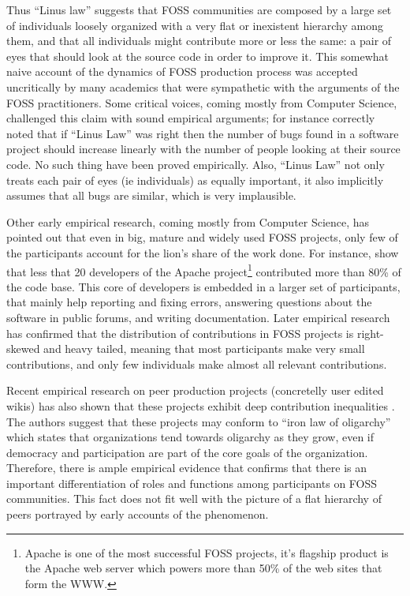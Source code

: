 Thus ``Linus law'' suggests that FOSS communities are composed by a large set of individuals loosely organized with a very flat or inexistent hierarchy among them, and that all individuals might contribute more or less the same: a pair of eyes that should look at the source code in order to improve it. This somewhat naive account of the dynamics of FOSS production process was accepted uncritically by many academics that were sympathetic with the arguments of the FOSS practitioners. Some critical voices, coming mostly from Computer Science, challenged this claim with sound empirical arguments; for instance \citet{glass:2002} correctly noted that if ``Linus Law'' was right then the number of bugs found in a software project should increase linearly with the number of people looking at their source code. No such thing have been proved empirically. Also, ``Linus Law'' not only treats each pair of eyes (ie individuals) as equally important, it also implicitly assumes that all bugs are similar, which is very implausible.

Other early empirical research, coming mostly from Computer Science, has pointed out that even in big, mature and widely used FOSS projects, only few of the participants account for the lion's share of the work done. For instance, \citet{mockus:2002} show that less that 20 developers of the Apache project\footnote{Apache is one of the most successful FOSS projects, it's flagship product is the Apache web server which powers more than 50\% of the web sites that form the WWW.} contributed more than 80\% of the code base. This core of developers is embedded in a larger set of participants, that mainly help reporting and fixing errors, answering questions about the software in public forums, and writing documentation. Later empirical research has confirmed that the distribution of contributions in FOSS projects is right-skewed and heavy tailed, meaning that most participants make very small contributions, and only few individuals make almost all relevant contributions.

Recent empirical research on peer production projects (concretelly user edited wikis) has also shown that these projects exhibit deep contribution inequalities \citep{shaw:2014}. The authors suggest that these projects may conform to \citet{michels:1915} ``iron law of oligarchy'' which states that organizations tend towards oligarchy as they grow, even if democracy and participation are part of the core goals of the organization. Therefore, there is ample empirical evidence that confirms that there is an important differentiation of roles and functions among participants on FOSS communities. This fact does not fit well with the picture of a flat hierarchy of peers portrayed by early accounts of the phenomenon.

